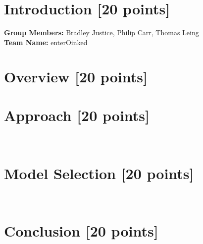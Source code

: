 \newif\ifshowsolutions
\showsolutionstrue







\pagestyle{fancy}




\newpage

\section{Introduction [20 points]}
\textbf{Group Members:} Bradley Justice, Philip Carr, Thomas Leing
\\
\textbf{Team Name:} enterOinked 
\\
\newpage

\section{Overview [20 points]}
\newpage

\section{Approach [20 points]}
\newpage~
\newpage

\section{Model Selection [20 points]}
\newpage~
\newpage

\newpage
\section{Conclusion [20 points]}
\newpage~
\newpage



